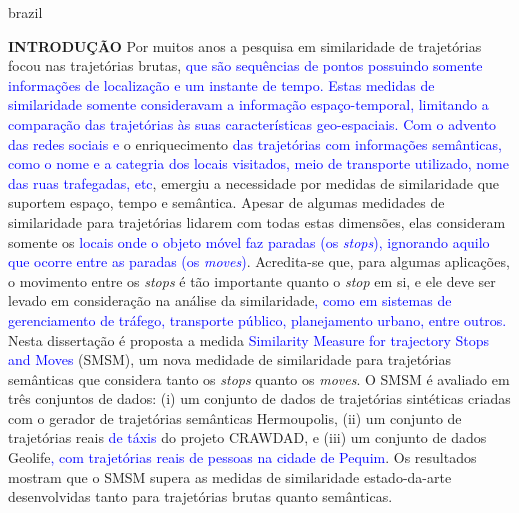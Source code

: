 {
    \begin{otherlanguage*}{brazil}
    \begin{resumo}
        \textbf{INTRODUÇÃO}
        \newline
        \newline
        Por muitos anos a pesquisa em similaridade de trajetórias focou nas trajetórias brutas, \textcolor{blue}{que são sequências de pontos possuindo somente informações de localização e um instante de tempo. Estas medidas de similaridade somente consideravam a informação espaço-temporal, limitando a comparação das trajetórias às suas características geo-espaciais. Com o advento das redes sociais e} o enriquecimento \textcolor{blue}{das trajetórias com informações semânticas, como o nome e a categria dos locais visitados, meio de transporte utilizado, nome das ruas trafegadas, etc}, emergiu a necessidade por medidas de similaridade que suportem espaço, tempo e semântica. Apesar de algumas medidades de similaridade para trajetórias lidarem com todas estas dimensões, elas consideram somente os \textcolor{blue}{locais onde o objeto móvel faz paradas (os \emph{stops}), ignorando aquilo que ocorre entre as paradas (os \emph{moves})}.
        Acredita-se que, para algumas aplicações, o movimento entre os \emph{stops} é tão importante quanto o \emph{stop} em si, e ele deve ser levado em consideração na análise da similaridade\textcolor{blue}{, como em sistemas de gerenciamento de tráfego, transporte público, planejamento urbano, entre outros.}
        Nesta dissertação é proposta a medida \textcolor{blue}{Similarity Measure for trajectory Stops and Moves} (SMSM), um nova medidade de similaridade para trajetórias semânticas que considera tanto os \emph{stops} quanto os \emph{moves}.
        O SMSM é avaliado em três conjuntos de dados: (i) um conjunto de dados de trajetórias sintéticas criadas com o gerador de trajetórias semânticas Hermoupolis, (ii) um conjunto de trajetórias reais \textcolor{blue}{de táxis} do projeto CRAWDAD, e (iii) um conjunto de dados Geolife\textcolor{blue}{, com trajetórias reais de pessoas na cidade de Pequim}. Os resultados mostram que o SMSM supera as medidas de similaridade estado-da-arte desenvolvidas tanto para trajetórias brutas quanto semânticas.
        

\end{resumo}
\end{otherlanguage*}}
